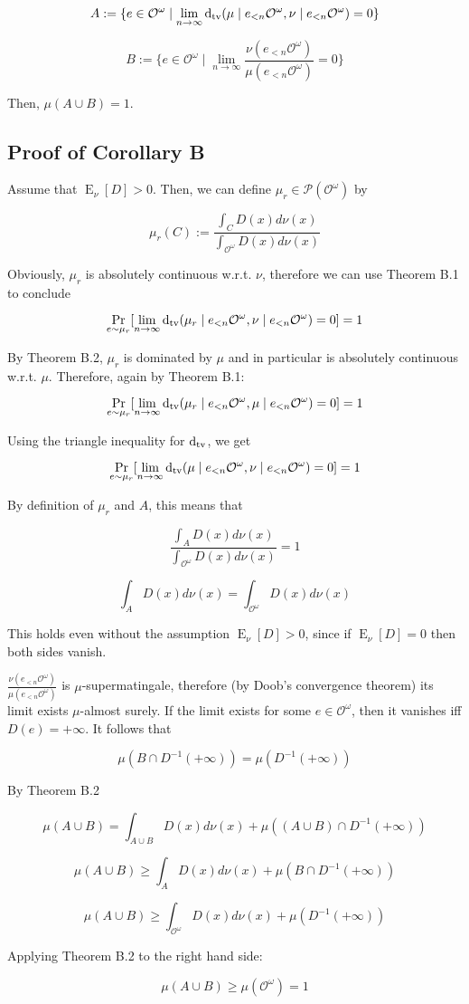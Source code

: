 \documentclass[a4paper]{article}
\DeclareMathOperator{\Prb}{Pr}
\DeclareMathOperator{\E}{E}
\newcommand{\Dtv}{\operatorname{d}_{\textnormal{tv}}}
\newcommand{\Prob}{\mathcal{P}}
\newcommand{\Obs}{\mathcal{O}}
\newcommand{\ObsO}{\Obs^\omega}
\begin{document}
$$A:=\{e \in \ObsO \mid \lim_{n \rightarrow \infty} \Dtv(\mu \mid e_{<n}\ObsO, \nu \mid e_{<n}\ObsO) = 0\}$$

$$B:=\{e \in \ObsO \mid \lim_{n \rightarrow \infty} \frac{\nu(e_{<n}\ObsO)}{\mu(e_{<n}\ObsO)} = 0\}$$

Then, ${\mu(A \cup B) = 1}$.

\subsection{Proof of Corollary B}

Assume that ${\E_\nu[D] > 0}$. Then, we can define ${\mu_r \in \Prob(\ObsO)}$ by

$$\mu_r(C):=\frac{\int_{C} D(x) d\nu(x)}{\int_{\ObsO} D(x) d\nu(x)}$$

Obviously, ${\mu_r}$ is absolutely continuous w.r.t. ${\nu}$, therefore we can use Theorem B.1 to conclude

$$\Prb_{e \sim \mu_r}[\lim_{n \rightarrow \infty} \Dtv(\mu_r \mid e_{<n}\ObsO, \nu \mid e_{<n}\ObsO) = 0] = 1$$

By Theorem B.2, ${\mu_r}$ is dominated by ${\mu}$ and in particular is absolutely continuous w.r.t. ${\mu}$. Therefore, again by Theorem B.1:

$$\Prb_{e \sim \mu_r}[\lim_{n \rightarrow \infty} \Dtv(\mu_r \mid e_{<n}\ObsO, \mu \mid e_{<n}\ObsO) = 0] = 1$$

Using the triangle inequality for ${\Dtv}$, we get

$$\Prb_{e \sim \mu_r}[\lim_{n \rightarrow \infty} \Dtv(\mu \mid e_{<n}\ObsO, \nu \mid e_{<n}\ObsO) = 0] = 1$$

By definition of ${\mu_r}$ and ${A}$, this means that

$$\frac{\int_{A} D(x) d\nu(x)}{\int_{\ObsO} D(x) d\nu(x)} = 1$$

$$\int_{A} D(x) d\nu(x) = \int_{\ObsO} D(x) d\nu(x)$$

This holds even without the assumption ${\E_\nu[D] > 0}$, since if ${\E_\nu[D] = 0}$ then both sides vanish.

${\frac{\nu(e_{<n}\ObsO)}{\mu(e_{<n}\ObsO)}}$ is ${\mu}$-supermatingale, therefore (by Doob's convergence theorem) its limit exists ${\mu}$-almost surely. If the limit exists for some ${e \in \ObsO}$, then it vanishes iff ${D(e)=+\infty}$. It follows that

$$\mu(B \cap D^{-1}(+\infty)) = \mu(D^{-1}(+\infty))$$

By Theorem B.2

$$\mu(A \cup B) = \int_{A \cup B} D(x) d\nu(x) + \mu((A \cup B) \cap D^{-1}(+\infty))$$

$$\mu(A \cup B) \geq \int_{A} D(x) d\nu(x) + \mu(B \cap D^{-1}(+\infty))$$

$$\mu(A \cup B) \geq \int_{\ObsO} D(x) d\nu(x) + \mu(D^{-1}(+\infty))$$

Applying Theorem B.2 to the right hand side:

$$\mu(A \cup B) \geq \mu(\ObsO) = 1$$
\end{document}
